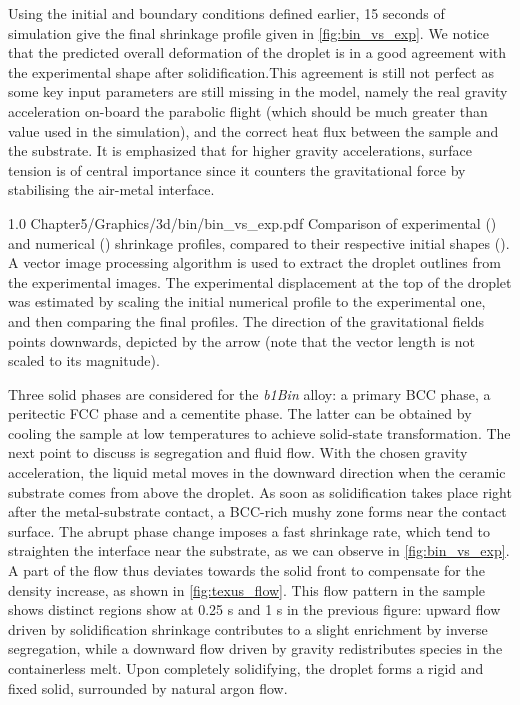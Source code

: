 Using the initial and boundary conditions defined earlier, 15 seconds of simulation give the final shrinkage profile given in \cref{fig:bin_vs_exp}.
We notice that the predicted overall deformation of the droplet is in a good agreement with the experimental shape after solidification.This agreement is
still not perfect as some key input parameters are still missing in the model, namely the real gravity acceleration on-board the parabolic flight (which should
be much greater than value used in the simulation), and the correct heat flux between the sample and the substrate. It is emphasized that for higher gravity
accelerations, surface tension is of central importance since it counters the gravitational force by stabilising the air-metal interface.

\begin{figureth}
{1.0}
{Chapter5/Graphics/3d/bin/bin_vs_exp.pdf}
{Comparison of experimental () and numerical () shrinkage profiles, compared to their respective initial shapes (). 
A vector image processing algorithm is used to extract the droplet outlines from the experimental images. 
The experimental displacement at the top of the droplet was estimated by scaling 
the initial numerical profile to the experimental one, and then comparing the final profiles.
The direction of the gravitational fields points downwards, depicted
  by the arrow (note that the vector length is not scaled to its magnitude).}
\label{fig:bin_vs_exp}
\end{figureth}

Three solid phases are considered for the \emph{b1Bin} alloy: a primary BCC phase, a peritectic FCC phase and a cementite phase. 
The latter can be obtained by cooling the sample at low temperatures to achieve solid-state transformation.
The next point to discuss is segregation and fluid flow. With the chosen gravity acceleration, the liquid metal moves in the downward direction when the
ceramic substrate comes from above the droplet. As soon as solidification takes place right after the metal-substrate contact, a BCC-rich mushy zone 
forms near the contact surface. The abrupt phase change imposes a fast shrinkage rate, which tend to straighten the interface near the substrate, as we can observe in \cref{fig:bin_vs_exp}. 
A part of the flow thus deviates towards the solid front 
to compensate for the density increase, as shown in \cref{fig:texus_flow}. 
This flow pattern in the sample shows distinct regions show at 0.25 s and 1 s in the previous figure: 
upward flow driven by solidification shrinkage contributes to a slight enrichment by inverse segregation,
while a downward flow driven by gravity redistributes species in the containerless melt. Upon completely 
solidifying, the droplet forms a rigid and fixed solid, surrounded by natural argon flow. 

